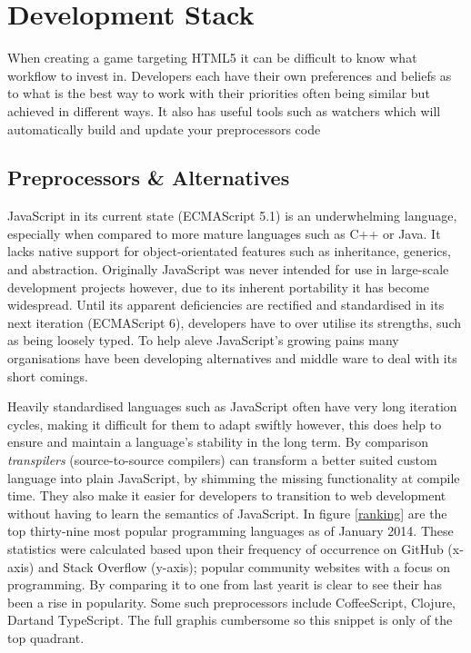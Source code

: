 \documentclass[final]{cmpreport}
\begin{document}
\section{Development Stack}
When creating a game targeting HTML5 it can be difficult to know what workflow to invest in. Developers each have their own preferences and beliefs as to what is the best way to work with their priorities often being similar but achieved in different ways. It also has useful tools such as watchers which will automatically build and update your preprocessors code

\subsection{Preprocessors \& Alternatives}
\label{sec:transpilers}

JavaScript in its current state (ECMAScript 5.1) is an underwhelming language, especially when compared to more mature languages such as C++ or Java. It lacks native support for object-orientated features such as inheritance, generics, and abstraction. Originally JavaScript was never intended for use in large-scale development projects however, due to its inherent portability it has become widespread. Until its apparent deficiencies are rectified and standardised in its next iteration (ECMAScript 6), developers have to over utilise its strengths, such as being loosely typed. To help aleve JavaScript's growing pains many organisations have been developing alternatives and middle ware to deal with its short comings.

Heavily standardised languages such as JavaScript often have very long iteration cycles, making it difficult for them to adapt swiftly however, this does help to ensure and maintain a language's stability in the long term. By comparison \textit{transpilers} (source-to-source compilers) can transform a better suited custom language into plain JavaScript, by shimming the missing functionality at compile time. They also make it easier for developers to transition to web development without having to learn the semantics of JavaScript. In figure \ref{ranking} are the top thirty-nine most popular programming languages as of January 2014. These statistics were calculated based upon their frequency of occurrence on GitHub (x-axis) and Stack Overflow (y-axis); popular community websites with a focus on programming. By comparing it to one from last year\footnotemark it is clear to see their has been a rise in popularity. Some such preprocessors include CoffeeScript\footnotemark, Clojure\footnotemark, Dart\footnotemark and TypeScript\footnotemark. The full graph\footnotemark is cumbersome so this snippet is only of the top quadrant.
\end{document}
